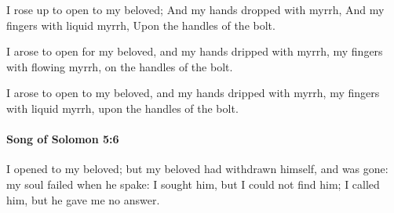 			\begin{versebox}
					\item[BHS] 
					\item[LXX] 
					\item[ASV] I rose up to open to my beloved; And my hands dropped with myrrh, And my fingers with liquid myrrh, Upon the handles of the bolt.
					\item[NIV] I arose to open for my beloved, and my hands dripped with myrrh, my fingers with flowing myrrh, on the handles of the bolt.
					\item[NRSV] I arose to open to my beloved, and my hands dripped with myrrh, my fingers with liquid myrrh, upon the handles of the bolt.
			\end{versebox}

		\paragraph{Song of Solomon 5:6} %
			\label{SONGOFSOLOMON-5-6}

			I opened to my beloved; but my beloved had withdrawn himself, and was gone: my soul failed when he spake: I sought him, but I could not find him; I called him, but he gave me no answer.

